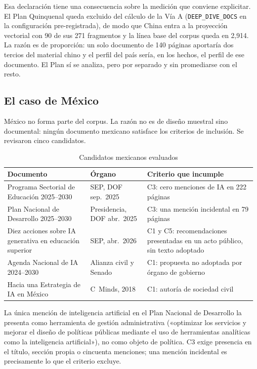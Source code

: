 \documentclass[12pt,letterpaper]{article}
\begin{document}
Esa declaración tiene una consecuencia sobre la medición que conviene explicitar. El Plan Quinquenal queda excluido del cálculo de la Vía A (\texttt{DEEP\_DIVE\_DOCS} en la configuración pre-registrada), de modo que China entra a la proyección vectorial con 90 de sus 271 fragmentos y la línea base del corpus queda en 2{,}914. La razón es de proporción: un solo documento de 140 páginas aportaría dos tercios del material chino y el perfil del país sería, en los hechos, el perfil de ese documento. El Plan sí se analiza, pero por separado y sin promediarse con el resto.

\subsection{El caso de México}
\label{subsec:mexico}

México no forma parte del corpus. La razón no es de diseño muestral sino documental: ningún documento mexicano satisface los criterios de inclusión. Se revisaron cinco candidatos.

\begin{table}[htbp]
\centering
\small
\caption{Candidatos mexicanos evaluados}
\begin{tabular}{@{}p{5.2cm}p{3.4cm}p{5.2cm}@{}}
\toprule
\textbf{Documento} & \textbf{Órgano} & \textbf{Criterio que incumple} \\
\midrule
Programa Sectorial de Educación 2025--2030 & SEP, DOF sep.\ 2025 & C3: cero menciones de IA en 222 páginas \\
Plan Nacional de Desarrollo 2025--2030 & Presidencia, DOF abr.\ 2025 & C3: una mención incidental en 79 páginas \\
Diez acciones sobre IA generativa en educación superior & SEP, abr.\ 2026 & C1 y C5: recomendaciones presentadas en un acto público, sin texto adoptado \\
Agenda Nacional de IA 2024--2030 & Alianza civil y Senado & C1: propuesta no adoptada por órgano de gobierno \\
Hacia una Estrategia de IA en México & C~Minds, 2018 & C1: autoría de sociedad civil \\
\bottomrule
\end{tabular}
\end{table}

La única mención de inteligencia artificial en el Plan Nacional de Desarrollo la presenta como herramienta de gestión administrativa («optimizar los servicios y mejorar el diseño de políticas públicas mediante el uso de herramientas analíticas como la inteligencia artificial»), no como objeto de política. C3 exige presencia en el título, sección propia o cincuenta menciones; una mención incidental es precisamente lo que el criterio excluye.
\end{document}
